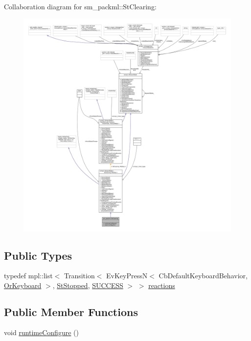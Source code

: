 Collaboration diagram for sm\+\_\+packml\+:\+:St\+Clearing\+:
\nopagebreak
\begin{figure}[H]
\begin{center}
\leavevmode
\includegraphics[width=350pt]{structsm__packml_1_1StClearing__coll__graph}
\end{center}
\end{figure}
\subsection*{Public Types}
\begin{DoxyCompactItemize}
\item 
typedef mpl\+::list$<$ Transition$<$ Ev\+Key\+PressN$<$ Cb\+Default\+Keyboard\+Behavior, \hyperlink{classsm__packml_1_1OrKeyboard}{Or\+Keyboard} $>$, \hyperlink{structsm__packml_1_1StStopped}{St\+Stopped}, \hyperlink{classSUCCESS}{S\+U\+C\+C\+E\+SS} $>$ $>$ \hyperlink{structsm__packml_1_1StClearing_afc7ff77e88b7240de8776e08c3bda91d}{reactions}
\end{DoxyCompactItemize}
\subsection*{Public Member Functions}
\begin{DoxyCompactItemize}
\item 
void \hyperlink{structsm__packml_1_1StClearing_aa01b5557a7978b55920681ac846849b9}{runtime\+Configure} ()
\end{DoxyCompactItemize}
